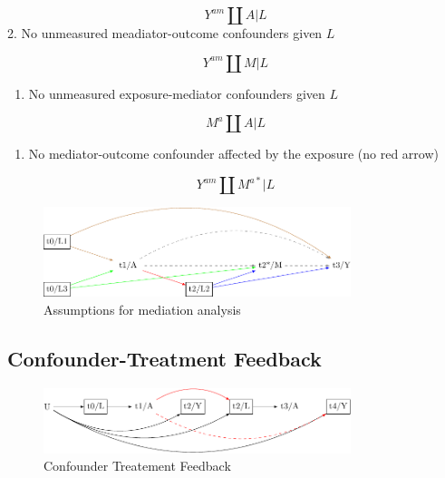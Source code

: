 \documentclass[
  singlecolumn]{report}
\providecommand{\tightlist}{%
  \setlength{\itemsep}{0pt}\setlength{\parskip}{0pt}}\usepackage{longtable,booktabs,array}
\begin{document}
\[Y^{am}\coprod A|L\] 2. No unmeasured meadiator-outcome confounders
given \(L\)

\[Y^{am}\coprod M|L\]

\begin{enumerate}
\def\labelenumi{\arabic{enumi}.}
\setcounter{enumi}{2}
\tightlist
\item
  No unmeasured exposure-mediator confounders given \(L\)
\end{enumerate}

\[M^{a}\coprod A|L\]

\begin{enumerate}
\def\labelenumi{\arabic{enumi}.}
\setcounter{enumi}{3}
\tightlist
\item
  No mediator-outcome confounder affected by the exposure (no red arrow)
\end{enumerate}

\[Y^{am}\coprod M^{a*}|L\]

\begin{figure}

{\centering \includegraphics[width=0.8\textwidth,height=\textheight]{causal-dags_files/figure-pdf/fig-dag-mediation-assuptions-1.pdf}

}

\caption{\label{fig-dag-mediation-assuptions}Assumptions for mediation
analysis}

\end{figure}

\hypertarget{confounder-treatment-feedback}{%
\subsection{Confounder-Treatment
Feedback}\label{confounder-treatment-feedback}}

\begin{figure}

{\centering \includegraphics[width=0.8\textwidth,height=\textheight]{causal-dags_files/figure-pdf/fig-dag-9-1.pdf}

}

\caption{\label{fig-dag-9}Confounder Treatement Feedback}

\end{figure}
\end{document}
